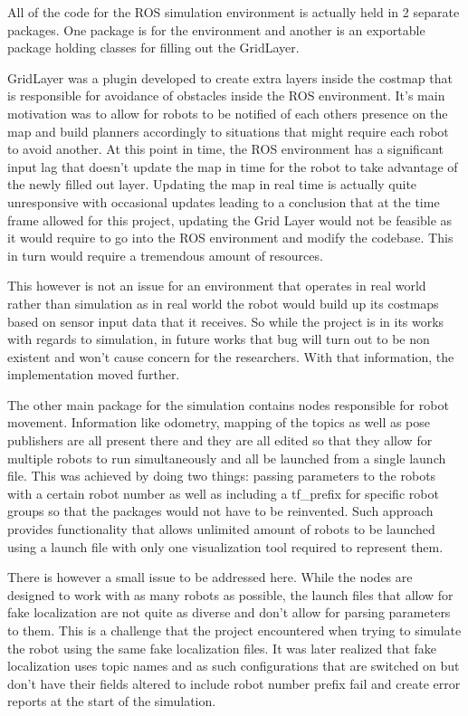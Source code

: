 \documentclass{report}
\begin{document}
        All of the code for the ROS simulation environment is actually held in 2 separate packages. One package is for the environment and another is an exportable package holding classes for filling out the GridLayer.

        GridLayer was a plugin developed to create extra layers inside the costmap that is responsible for avoidance of obstacles inside the ROS environment. It's main motivation was to allow for robots to be notified of each others presence on the map and build planners accordingly to situations that might require each robot to avoid another. At this point in time, the ROS environment has a significant input lag that doesn't update the map in time for the robot to take advantage of the newly filled out layer. Updating the map in real time is actually quite unresponsive with occasional updates leading to a conclusion that at the time frame allowed for this project, updating the Grid Layer would not be feasible as it would require to go into the ROS environment and modify the codebase. This in turn would require a tremendous amount of resources.

        This however is not an issue for an environment that operates in real world rather than simulation as in real world the robot would build up its costmaps based on sensor input data that it receives. So while the project is in its works with regards to simulation, in future works that bug will turn out to be non existent and won't cause concern for the researchers. With that information, the implementation moved further.

        The other main package for the simulation contains nodes responsible for robot movement. Information like odometry, mapping of the topics as well as pose publishers are all present there and they are all edited so that they allow for multiple robots to run simultaneously and all be launched from a single launch file. This was achieved by doing two things: passing parameters to the robots with a certain robot number as well as including a tf\_prefix for specific robot groups so that the packages would not have to be reinvented. Such approach provides functionality that allows unlimited amount of robots to be launched using a launch file with only one visualization tool required to represent them.

        There is however a small issue to be addressed here. While the nodes are designed to work with as many robots as possible, the launch files that allow for fake localization are not quite as diverse and don't allow for parsing parameters to them. This is a challenge that the project encountered when trying to simulate the robot using the same fake localization files. It was later realized that fake localization uses topic names and as such configurations that are switched on but don't have their fields altered to include robot number prefix fail and create error reports at the start of the simulation.
\end{document}
